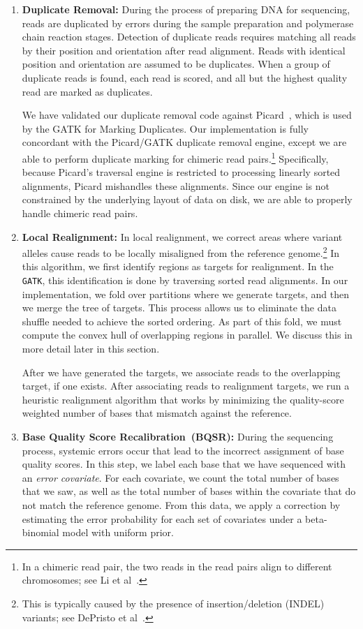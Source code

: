 \documentclass[phd]{ucbthesis}
\begin{document}
\begin{enumerate}
\item \textbf{Duplicate Removal:} During the process of preparing DNA for sequencing, reads are duplicated by
errors during the sample preparation and polymerase chain reaction stages. Detection of duplicate reads
requires matching all reads by their position and orientation after read alignment. Reads with identical position
and orientation are assumed to be duplicates. When a group of duplicate reads is found, each read is scored,
and all but the highest quality read are marked as duplicates.

We have validated our duplicate removal code against Picard~\cite{picard}, which is used by the GATK
for Marking Duplicates. Our implementation is fully concordant with the Picard/GATK duplicate removal
engine, except we are able to perform duplicate marking for chimeric read pairs.\footnote{In a chimeric read pair,
the two reads in the read pairs align to different chromosomes; see Li et al~\cite{li10}.}
Specifically, because Picard's traversal engine is restricted to processing linearly sorted alignments,
Picard mishandles these alignments. Since our engine is not constrained by the underlying layout of data
on disk, we are able to properly handle chimeric read pairs.
\item \textbf{Local Realignment:} In local realignment, we correct areas where variant alleles cause reads to be
locally misaligned from the reference genome.\footnote{This is typically caused by the presence of
insertion/deletion (INDEL) variants; see DePristo et al~\cite{depristo11}.} In this algorithm, we first identify regions
as targets for realignment. In the \texttt{GATK}, this identification is done by traversing sorted read alignments. In our implementation,
we fold over partitions where we generate targets, and then we merge the tree of targets. This process allows us
to eliminate the data shuffle needed to achieve the sorted ordering. As part of this fold, we must
compute the convex hull of overlapping regions in parallel. We discuss this in more detail later in this section.

After we have generated the targets, we associate reads to the overlapping target, if one exists. After
associating reads to realignment targets, we run a heuristic realignment algorithm that works by minimizing
the quality-score weighted number of bases that mismatch against the reference.
\item \textbf{Base Quality Score Recalibration~(BQSR):} During the sequencing process, systemic errors occur
that lead to the incorrect assignment of base quality scores. In this step, we label each base that we have
sequenced with an \emph{error covariate}. For each covariate, we count the total number of bases that we saw,
as well as the total number of bases within the covariate that do not match the reference genome. From this data, 
we apply a correction by estimating the error probability for each set of covariates under a beta-binomial model
with uniform prior.


\end{enumerate}
\end{document}

